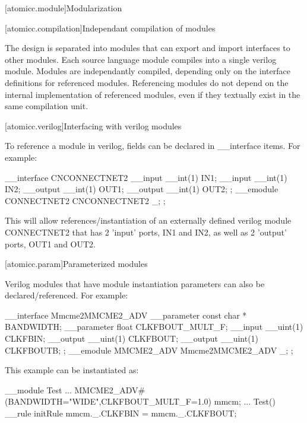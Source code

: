 [atomicc.module]{Modularization}

[atomicc.compilation]{Independant compilation of modules}

The design is separated into modules that can export and import interfaces to other modules.
Each source language module compiles into a single verilog module.  Modules are independantly
compiled, depending only on the interface definitions for referenced modules.
Referencing modules do not depend on the internal implementation of referenced modules,
even if they textually exist in the same compilation unit.

[atomicc.verilog]{Interfacing with verilog modules}

To reference a module in verilog, fields can be declared in __interface items.
For example:

\begin{codeblock}
     __interface CNCONNECTNET2 {
         __input  __int(1)         IN1;
         __input  __int(1)         IN2;
         __output __int(1)         OUT1;
         __output __int(1)         OUT2;
     };
     __emodule CONNECTNET2 {
         CNCONNECTNET2 _;
     };
\end{codeblock}

This will allow references/instantiation of an externally defined verilog module CONNECTNET2
that has 2 'input' ports, IN1 and IN2, as well as 2 'output' ports, OUT1 and OUT2.

[atomicc.param]{Parameterized modules}

Verilog modules that have module instantiation parameters can also be declared/referenced.
For example:

\begin{codeblock}
     __interface Mmcme2MMCME2_ADV {
         __parameter const char *  BANDWIDTH;
         __parameter float         CLKFBOUT_MULT_F;
         __input  __uint(1)        CLKFBIN;
         __output __uint(1)        CLKFBOUT;
         __output __uint(1)        CLKFBOUTB;
     };
     __emodule MMCME2_ADV {
         Mmcme2MMCME2_ADV _;
     };
\end{codeblock}

This example can be instantiated as:

\begin{codeblock}
     __module Test {
         ...
         MMCME2_ADV#(BANDWIDTH="WIDE",CLKFBOUT_MULT_F=1.0) mmcm;
         ...
         Test() {
            __rule initRule {
                mmcm._.CLKFBIN = mmcm._.CLKFBOUT;
            }
         }
     }
\end{codeblock}

